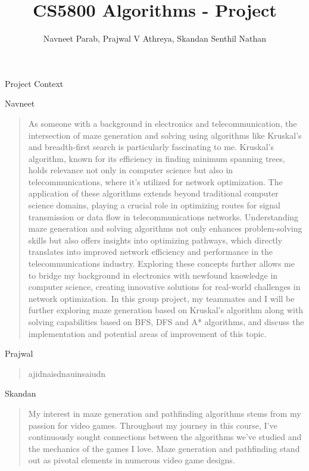 \documentclass{amsart}
\author{Navneet Parab, Prajwal V Athreya, Skandan Senthil Nathan}
\title{CS5800 Algorithms - Project}
\begin{document}
\maketitle

\begin{section}{Project Context}

    \begin{subsection}{Navneet}
        \begin{quote}
            As someone with a background in electronics and telecommunication, the intersection of maze generation and solving using algorithms like Kruskal's and breadth-first search is particularly fascinating to me. Kruskal's algorithm, known for its efficiency in finding minimum spanning trees, holds relevance not only in computer science but also in telecommunications, where it's utilized for network optimization. The application of these algorithms extends beyond traditional computer science domains, playing a crucial role in optimizing routes for signal transmission or data flow in telecommunications networks. Understanding maze generation and solving algorithms not only enhances problem-solving skills but also offers insights into optimizing pathways, which directly translates into improved network efficiency and performance in the telecommunications industry. Exploring these concepts further allows me to bridge my background in electronics with newfound knowledge in computer science, creating innovative solutions for real-world challenges in network optimization. In this group project, my teammates and I will be further exploring maze generation based on Kruskal’s algorithm along with solving capabilities based on BFS, DFS and A* algorithms, and discuss the implementation and potential areas of improvement of this topic.
        \end{quote}
    \end{subsection}

    \begin{subsection}{Prajwal}
        \begin{quote}
            ajidnaisdnauinsaiudn    
        \end{quote}
    \end{subsection}

    \begin{subsection}{Skandan}
        \begin{quote}
            My interest in maze generation and pathfinding algorithms stems from my passion for video games. Throughout my journey in this course, I've continuously sought connections between the algorithms we've studied and the mechanics of the games I love. Maze generation and pathfinding stand out as pivotal elements in numerous video game designs.
            

\end{quote}
\end{subsection}
\end{section}
\end{document}
